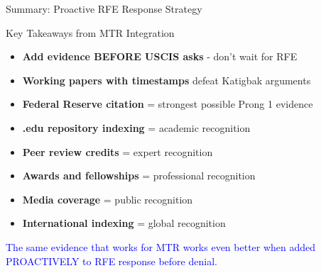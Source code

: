 \documentclass[11pt]{beamer}
\begin{document}
	\begin{frame}{Summary: Proactive RFE Response Strategy}
		\scriptsize
		\begin{block}{Key Takeaways from MTR Integration}
			\begin{itemize}
				\item \textbf{Add evidence BEFORE USCIS asks} - don't wait for RFE
				\item \textbf{Working papers with timestamps} defeat Katigbak arguments
				\item \textbf{Federal Reserve citation} = strongest possible Prong 1 evidence
				\item \textbf{.edu repository indexing} = academic recognition
				\item \textbf{Peer review credits} = expert recognition
				\item \textbf{Awards and fellowships} = professional recognition
				\item \textbf{Media coverage} = public recognition
				\item \textbf{International indexing} = global recognition
			\end{itemize}
			\vspace{0.2cm}
			\textcolor{blue}{The same evidence that works for MTR works even better when added PROACTIVELY to RFE response before denial.}
		\end{block}
	\end{frame}
	
	
\end{document}
